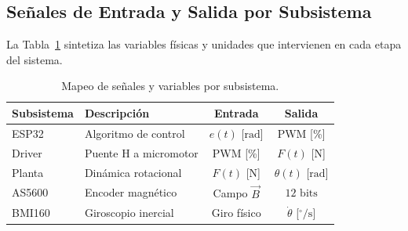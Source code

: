 \subsection{Señales de Entrada y Salida por Subsistema}
La Tabla~\ref{tab:senales_subsistemas} sintetiza las variables físicas y unidades que intervienen en cada etapa del sistema.

\begin{table}[!t]
  \centering
  \caption{Mapeo de señales y variables por subsistema.}
  \label{tab:senales_subsistemas}
  \renewcommand{\arraystretch}{1.25}
  \footnotesize
  \begin{tabularx}{\columnwidth}{@{}lXcc@{}}
    \toprule
    \textbf{Subsistema} & \textbf{Descripción} & \textbf{Entrada} & \textbf{Salida} \\
    \midrule
    ESP32       & Algoritmo de control    & $e(t)$ [$\mathrm{rad}$] & PWM [\%] \\
    Driver      & Puente H a micromotor   & PWM [\%]                & $F(t)$ [$\mathrm{N}$] \\
    Planta      & Dinámica rotacional     & $F(t)$ [$\mathrm{N}$]   & $\theta(t)$ [$\mathrm{rad}$] \\
    AS5600      & Encoder magnético       & Campo $\vec{B}$         & $12\text{ bits}$ \\
    BMI160      & Giroscopio inercial     & Giro físico             & $\dot{\theta}$ [$\mathrm{^\circ/s}$] \\
    \bottomrule
  \end{tabularx}
\end{table}
